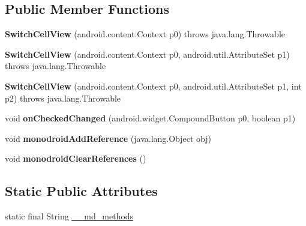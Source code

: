 \subsection*{Public Member Functions}
\begin{DoxyCompactItemize}
\item 
\mbox{\label{classmd5b60ffeb829f638581ab2bb9b1a7f4f3f_1_1SwitchCellView_a1a542bccac4c26b5a04b987ac7471b91}} 
{\bfseries Switch\+Cell\+View} (android.\+content.\+Context p0)  throws java.\+lang.\+Throwable 	
\item 
\mbox{\label{classmd5b60ffeb829f638581ab2bb9b1a7f4f3f_1_1SwitchCellView_ac3d2a947e764c684c9a5dad1a993e526}} 
{\bfseries Switch\+Cell\+View} (android.\+content.\+Context p0, android.\+util.\+Attribute\+Set p1)  throws java.\+lang.\+Throwable 	
\item 
\mbox{\label{classmd5b60ffeb829f638581ab2bb9b1a7f4f3f_1_1SwitchCellView_a58a93fdb9b3b35555b2772e70d41d644}} 
{\bfseries Switch\+Cell\+View} (android.\+content.\+Context p0, android.\+util.\+Attribute\+Set p1, int p2)  throws java.\+lang.\+Throwable 	
\item 
\mbox{\label{classmd5b60ffeb829f638581ab2bb9b1a7f4f3f_1_1SwitchCellView_aa03e11d93abb9b4b5c3b933f310b2a1e}} 
void {\bfseries on\+Checked\+Changed} (android.\+widget.\+Compound\+Button p0, boolean p1)
\item 
\mbox{\label{classmd5b60ffeb829f638581ab2bb9b1a7f4f3f_1_1SwitchCellView_a6526a7d8e09d4f580f9ba2058b1a31b7}} 
void {\bfseries monodroid\+Add\+Reference} (java.\+lang.\+Object obj)
\item 
\mbox{\label{classmd5b60ffeb829f638581ab2bb9b1a7f4f3f_1_1SwitchCellView_ac5c13d6e582a1a4005ce2de3fba31e9e}} 
void {\bfseries monodroid\+Clear\+References} ()
\end{DoxyCompactItemize}
\subsection*{Static Public Attributes}
\begin{DoxyCompactItemize}
\item 
static final String \hyperlink{classmd5b60ffeb829f638581ab2bb9b1a7f4f3f_1_1SwitchCellView_a1153176f1114dedfcdc6c831e33adfea}{\+\_\+\+\_\+md\+\_\+methods}
\end{DoxyCompactItemize}
